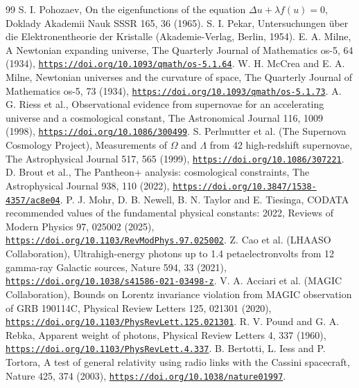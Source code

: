 \documentclass[pdflatex,sn-mathphys-num]{sn-jnl}
\theoremstyle{thmstyleone}
\theoremstyle{thmstyletwo}
\begin{document}
\begin{thebibliography}{99}
 S. I. Pohozaev, On the eigenfunctions of the equation $\Delta u + \lambda f(u) = 0$, Doklady Akademii Nauk SSSR 165, 36 (1965).
 S. I. Pekar, Untersuchungen \"uber die Elektronentheorie der Kristalle (Akademie-Verlag, Berlin, 1954).
 E. A. Milne, A Newtonian expanding universe, The Quarterly Journal of Mathematics os-5, 64 (1934), \href{https://doi.org/10.1093/qmath/os-5.1.64}{\nolinkurl{https://doi.org/10.1093/qmath/os-5.1.64}}.
 W. H. McCrea and E. A. Milne, Newtonian universes and the curvature of space, The Quarterly Journal of Mathematics os-5, 73 (1934), \href{https://doi.org/10.1093/qmath/os-5.1.73}{\nolinkurl{https://doi.org/10.1093/qmath/os-5.1.73}}.
 A. G. Riess et al., Observational evidence from supernovae for an accelerating universe and a cosmological constant, The Astronomical Journal 116, 1009 (1998), \href{https://doi.org/10.1086/300499}{\nolinkurl{https://doi.org/10.1086/300499}}.
 S. Perlmutter et al. (The Supernova Cosmology Project), Measurements of $\Omega$ and $\Lambda$ from 42 high-redshift supernovae, The Astrophysical Journal 517, 565 (1999), \href{https://doi.org/10.1086/307221}{\nolinkurl{https://doi.org/10.1086/307221}}.
 D. Brout et al., The Pantheon+ analysis: cosmological constraints, The Astrophysical Journal 938, 110 (2022), \href{https://doi.org/10.3847/1538-4357/ac8e04}{\nolinkurl{https://doi.org/10.3847/1538-4357/ac8e04}}.
 P. J. Mohr, D. B. Newell, B. N. Taylor and E. Tiesinga, CODATA recommended values of the fundamental physical constants: 2022, Reviews of Modern Physics 97, 025002 (2025), \href{https://doi.org/10.1103/RevModPhys.97.025002}{\nolinkurl{https://doi.org/10.1103/RevModPhys.97.025002}}.
 Z. Cao et al. (LHAASO Collaboration), Ultrahigh-energy photons up to 1.4 petaelectronvolts from 12 gamma-ray Galactic sources, Nature 594, 33 (2021), \href{https://doi.org/10.1038/s41586-021-03498-z}{\nolinkurl{https://doi.org/10.1038/s41586-021-03498-z}}.
 V. A. Acciari et al. (MAGIC Collaboration), Bounds on Lorentz invariance violation from MAGIC observation of GRB 190114C, Physical Review Letters 125, 021301 (2020), \href{https://doi.org/10.1103/PhysRevLett.125.021301}{\nolinkurl{https://doi.org/10.1103/PhysRevLett.125.021301}}.
 R. V. Pound and G. A. Rebka, Apparent weight of photons, Physical Review Letters 4, 337 (1960), \href{https://doi.org/10.1103/PhysRevLett.4.337}{\nolinkurl{https://doi.org/10.1103/PhysRevLett.4.337}}.
 B. Bertotti, L. Iess and P. Tortora, A test of general relativity using radio links with the Cassini spacecraft, Nature 425, 374 (2003), \href{https://doi.org/10.1038/nature01997}{\nolinkurl{https://doi.org/10.1038/nature01997}}.

\end{thebibliography}
\end{document}
